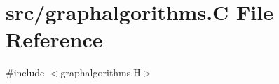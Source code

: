 \hypertarget{graphalgorithms_8_c}{}\section{src/graphalgorithms.C File Reference}
\label{graphalgorithms_8_c}
{\ttfamily \#include $<$graphalgorithms.\+H$>$}\newline
